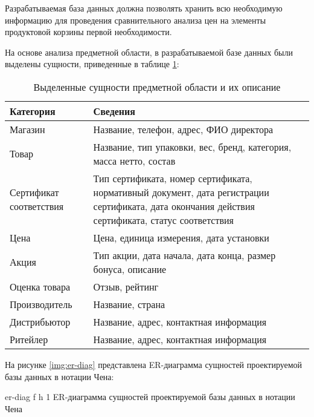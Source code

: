 Разрабатываемая база данных должна позволять хранить всю необходимую информацию для проведения сравнительного анализа цен на элементы продуктовой корзины первой необходимости. 

На основе анализа предметной области, в разрабатываемой базе данных были выделены сущности, приведенные в таблице \ref{tbl:db_entities}: 

\begin{table}[ht]
	\begin{center}
		\begin{threeparttable}
			\caption{Выделенные сущности предметной области и их описание}
			\label{tbl:db_entities}
			\begin{tabular}{|p{4cm}|p{10cm}|}
				\hline
				\textbf{Категория} & \textbf{Сведения} \\ \hline
				Магазин & Название, телефон, адрес, ФИО директора \\ 
				\hline
				Товар & Название, тип упаковки, вес, бренд, категория, масса нетто, состав \\ 
				\hline
				Сертификат соответствия & Тип сертификата, номер сертификата, нормативный документ, дата регистрации сертификата, дата окончания действия сертификата, статус соответствия \\ 
				\hline
				Цена & Цена, единица измерения, дата установки  \\ 
				\hline
				Акция & Тип акции, дата начала, дата конца, размер бонуса, описание \\ 
				\hline
				Оценка товара & Отзыв, рейтинг \\ 
				\hline
				Производитель & Название, страна \\ 
				\hline
				Дистрибьютор & Название, адрес, контактная информация \\ 
				\hline
				Ритейлер & Название, адрес, контактная информация \\ 
				\hline
			\end{tabular}
		\end{threeparttable}
	\end{center}
\end{table}

\clearpage

На рисунке \ref{img:er-diag} представлена ER-диаграмма сущностей проектируемой базы данных в нотации Чена:

{er-diag} %
{f} %
{h} %
{1\textwidth} %
{ER-диаграмма сущностей проектируемой базы данных в нотации Чена} %

